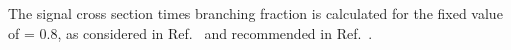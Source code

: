 The signal cross section times branching fraction is calculated
for the fixed value of \gzp = 0.8, as considered in Ref.~\cite{ATLAS-2015-PAS} and recommended in
Ref.~\cite{Abercrombie:2015wmb}. 


%
%
%
%
%
%
%
